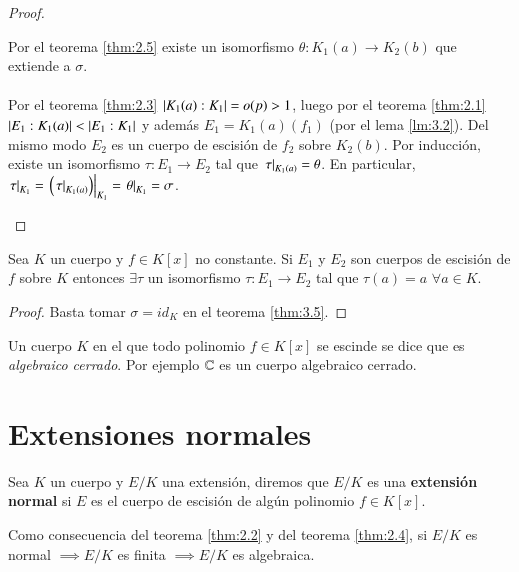 \begin{proof}
\begin{itemize}
\begin{center}
        \end{center}
        Por el teorema \ref{thm:2.5} existe un isomorfismo $\theta: K_1(a) \to K_2(b)$ que extiende a $\sigma$.\\\\
        Por el teorema \ref{thm:2.3} $\left|K_1(a):K_1\right| = o(p) > 1$, luego por el teorema \ref{thm:2.1} $\left|E_1:K_1(a)\right| < \left|E_1:K_1\right|$ y además $E_1 = K_1(a)(f_1)$ (por el lema \ref{lm:3.2}). Del mismo modo $E_2$ es un cuerpo de escisión de $f_2$ sobre $K_2(b)$.
        Por inducción, existe un isomorfismo $\tau: E_1 \to E_2$ tal que $\left.\tau\right|_{K_1(a)} = \theta$. En particular, $\left.\tau\right|_{K_1} = \left.\left( \left.\tau\right|_{K_1(a)} \right)\right|_{K_1} = \left.\theta\right|_{K_1} = \sigma$.
    \end{itemize}
\end{proof}

\begin{cor}
    Sea $K$ un cuerpo y $f \in K[x]$ no constante. Si $E_1$ y $E_2$ son cuerpos de escisión de $f$ sobre $K$ entonces $\exists \tau$ un isomorfismo $\tau: E_1 \to E_2$ tal que $\tau(a) = a$ $\forall a \in K$.
\end{cor}
\begin{proof}
    Basta tomar $\sigma = id_K$ en el teorema \ref{thm:3.5}.
\end{proof}

\begin{obs}
    Un cuerpo $K$ en el que todo polinomio $f \in K[x]$ se escinde se dice que es \textit{algebraico cerrado}. Por ejemplo $\mathbb{C}$ es un cuerpo algebraico cerrado.
\end{obs}

\section{Extensiones normales}

\begin{dfn}
    Sea $K$ un cuerpo y $E/K$ una extensión, diremos que $E/K$ es una \textbf{extensión normal} si $E$ es el cuerpo de escisión de algún polinomio $f \in K[x]$.
\end{dfn}

\begin{obs}
    Como consecuencia del teorema \ref{thm:2.2} y del teorema \ref{thm:2.4}, si $E/K$ es normal $\implies E/K$ es finita $\implies E/K$ es algebraica.
\end{obs}

